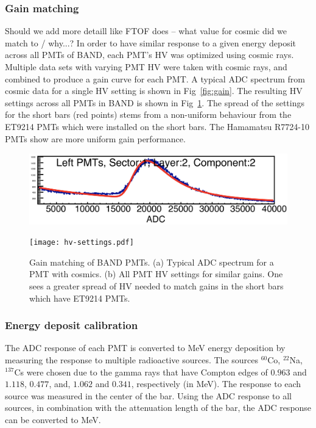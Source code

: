 \documentclass[3p,final,twocolumn]{elsarticle}
\begin{document}
\subsubsection{Gain matching}
{\color{red} Should we add more detaill like FTOF does -- what value for cosmic did we match to / why...?}
In order to have similar response to a given energy deposit across all PMTs of BAND, each PMT's HV was optimized using
cosmic rays. Multiple data sets with varying PMT HV were taken with cosmic rays, and combined to produce a gain curve for 
each PMT. A typical ADC spectrum from cosmic data for a single HV setting %
is shown in Fig~\ref{fig:gain}. The resulting HV settings across all PMTs in BAND is 
shown in Fig~\ref{fig:hv_settings}. The spread of the settings for the short bars (red points) stems from a non-uniform behaviour from the ET9214 PMTs which were installed on the short bars. The Hamamatsu R7724-10 PMTs show are more uniform gain performance.
\begin{figure}[h!]
	\centering
		\begin{minipage}{0.48\textwidth}
			\includegraphics[width=\textwidth]{adc-spectra.png}\\
			\subcaption{}
			\label{fig:gain}
		\end{minipage}
		\begin{minipage}{0.48\textwidth}
			\texttt{[image: hv-settings.pdf]}
			\subcaption{}
		\label{fig:hv_settings}
		\end{minipage}
		\caption{Gain matching of BAND PMTs. (a) Typical ADC spectrum for a PMT with cosmics. (b) All PMT HV settings for similar gains. One sees a greater 
		spread of HV needed to match gains in the short bars which have ET9214 PMTs.}
\end{figure}


\subsubsection{Energy deposit calibration}
The ADC response of each PMT is converted to \si{\mega\electronvolt} energy deposition by measuring the response to 
multiple radioactive sources. The sources $^{60}$Co, $^{22}$Na, $^{137}$Cs were chosen due to the gamma rays that have 
Compton edges of $0.963$ and $1.118$, $0.477$, and, $1.062$ and $0.341$, respectively (in \si{\mega\electronvolt}). The 
response to each source was measured in the center of the bar. Using the ADC response to all sources, in combination with the 
attenuation length of the bar, the ADC response can be converted to \si{\mega\electronvolt}.
\end{document}
